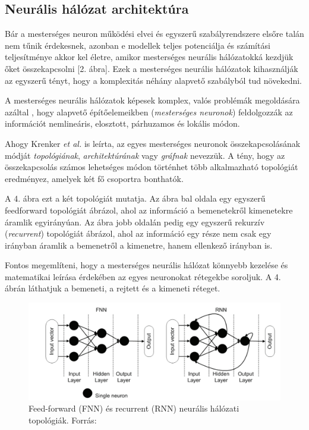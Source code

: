 \documentclass[12pt,a4]{article}
\begin{document}
	\subsection{Neurális hálózat architektúra}
	
	Bár a mesterséges neuron működési elvei és 
	egyszerű szabályrendszere elsőre talán nem tűnik érdekesnek, azonban e modellek teljes potenciálja és számítási teljesítménye akkor kel életre, 
	amikor mesterséges neurális hálózatokká
	kezdjük őket összekapcsolni [2. ábra]. 
	Ezek a mesterséges neurális hálózatok 
	kihasználják az egyszerű tényt, 
	hogy a komplexitás néhány alapvető
	szabályból tud növekedni.
	
	A mesterséges neurális hálózatok 
	képesek komplex, valós problémák megoldására azáltal
	, hogy 
	alapvető építőelemeikben (\textit{mesterséges neuronok}) feldolgozzák az információt nemlineáris,
	elosztott, párhuzamos és lokális módon.
	
	Ahogy Krenker \textit{et al.} 
	\cite{krenker} is leírta, az egyes mesterséges 
	neuronok összekapcsolásának módját 
	\textit{topológiának}, \textit{architektúrának} 
	vagy \textit{gráfnak} nevezzük. A tény, 
	hogy az összekapcsolás
	számos lehetséges módon történhet több alkalmazható topológiát eredményez, amelyek két fő csoportra bonthatók. 
	
	A 4. ábra ezt a két topológiát mutatja. Az ábra bal oldala egy egyszerű feedforward topológiát ábrázol, ahol az információ a bemenetekről kimenetekre áramlik egyirányúan. Az ábra jobb oldalán pedig egy egyszerű rekurzív (\textit{recurrent}) topológiát ábrázol, ahol az információ egy része nem csak egy irányban áramlik a bemenetről a kimenetre, hanem ellenkező irányban is.

	Fontos megemlíteni, hogy a mesterséges neurális hálózat könnyebb kezelése és matematikai leírása érdekében az egyes neuronokat rétegekbe soroljuk. A 4. ábrán láthatjuk a bemeneti, a rejtett és a kimeneti réteget.
	\begin{figure}[h]	
		\centering
		\includegraphics[width=1\linewidth]{topologies}
		\caption{Feed-forward (FNN) és recurrent (RNN) \newline\centering  neurális hálózati topológiák. 
			Forrás:\cite{krenker}}
	\end{figure}
\end{document}
